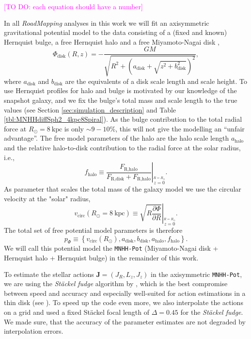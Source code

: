 \documentclass[iop,revtex4,numberedappendix,appendixfloats]{emulateapj}
\newcommand{\vect}[1]{\boldsymbol{#1}}
\newcommand{\RM}{{\sl RoadMapping}}
\newcommand{\Wilma}[1]{\textcolor{Magenta}{#1}}
\begin{document}
\Wilma{[TO DO: each equation should have a number]}

In all \RM{} analyses in this work we will fit an axisymmetric gravitational potential model to the data consisting of a (fixed and known) Hernquist bulge, a free Hernquist halo and a free Miyamoto-Nagai disk \citep{1975PASJ...27..533M},
\begin{equation}
\Phi_\text{disk}(R,z) = - \frac{GM}{\sqrt{R^2+(a_\text{disk}+\sqrt{z^2+b_\text{disk}^2})^2}}, \label{eq:MN-disk}
\end{equation}
where $a_\text{disk}$ and $b_\text{disk}$ are the equivalents of a disk scale length and scale height. To use Hernquist profiles for halo and bulge is motivated by our knowledge of the snapshot galaxy, and we fix the bulge's total mass and scale length to the true values (see Section \ref{sec:simulation_description} and Table \ref{tbl:MNHHdiffSph2_4kpc8Spiral}). As the bulge contribution to the total radial force at $R_\odot=8~\text{kpc}$ is only $\sim9-10\%$, this will not give the modelling an ``unfair advantage''. The free model parameters of the halo are the halo scale length $a_\text{halo}$ and the relative halo-to-disk contribution to the radial force at the solar radius, i.e.,
\begin{equation}
f_\text{halo} \equiv \left. \frac{F_\text{R,halo}}{F_\text{R,disk} + F_\text{R,halo}} \right|_{\stackrel{R=R_\odot}{z=0}}.\label{eq:fhalo}
\end{equation}
As parameter that scales the total mass of the galaxy model we use the circular velocity at the "solar" radius,
\begin{equation}
v_\text{circ}(R_\odot=8~\text{kpc}) \equiv \left. \sqrt{ R \frac{\partial \Phi}{\partial R} }\right|_{\stackrel{R=R_\odot}{z=0}} . \label{eq:circvel}
\end{equation}  
The total set of free potential model parameters is therefore
\begin{equation}
p_\Phi \equiv \left\{ v_\text{circ}(R_\odot),a_\text{disk},b_\text{disk},a_\text{halo},f_\text{halo}\right\}.
\end{equation} 
We will call this potential model the \texttt{MNHH-Pot} (Miyamoto-Nagai disk + Hernquist halo + Hernquist bulge) in the remainder of this work.

To estimate the stellar actions $\vect{J}=(J_R,L_z,J_z)$ in the axisymmetric \texttt{MNHH-Pot}, we are using the \emph{St\"{a}ckel fudge} algorithm by \citet{2012MNRAS.426.1324B}, which is the best compromise between speed and accuracy and especially well-suited for action estimations in a thin disk (see \citealt{2016MNRAS.457.2107S}). To speed up the code even more, we also interpolate the actions on a grid \citep{2012MNRAS.426.1324B,2015ApJS..216...29B} and used a fixed St\"{a}ckel focal length of $\Delta=0.45$ for the \emph{St\"{a}ckel fudge}. We made sure, that the accuracy of the parameter estimates are not degraded by interpolation errors.
\end{document}
